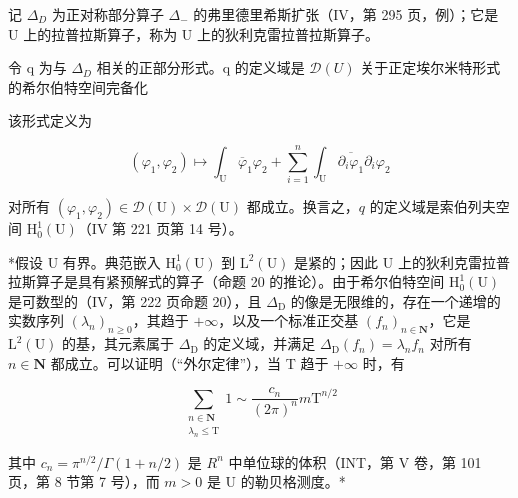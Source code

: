 记 \(\Delta_{D}\) 为正对称部分算子 \(\Delta_{-}\) 的弗里德里希斯扩张（IV，第 295 页，例）；它是 U 上的拉普拉斯算子，称为 U 上的狄利克雷拉普拉斯算子。

令 q 为与 \(\Delta_{D}\) 相关的正部分形式。q 的定义域是 \(\mathcal{D}(U)\) 关于正定埃尔米特形式的希尔伯特空间完备化

该形式定义为

\[
(\varphi_ {1}, \varphi_ {2}) \mapsto \int_ {\mathrm{U}} \overline {{\varphi}} _ {1} \varphi_ {2} + \sum_ {i = 1} ^ {n} \int_ {\mathrm{U}} \overline {{\partial_ {i} \varphi_ {1}}} \partial_ {i} \varphi_ {2}
\]

对所有 \((\varphi_{1},\varphi_{2})\in\mathcal{D}(\mathrm{U})\times\mathcal{D}(\mathrm{U})\) 都成立。换言之，\(q\) 的定义域是索伯列夫空间 \(\mathrm{H}_{0}^{1}(\mathrm{U})\)（IV 第 221 页第 14 号）。

*假设 U 有界。典范嵌入 \(\mathrm{H}_0^1 (\mathrm{U})\) 到 \(\mathrm{L}^2 (\mathrm{U})\) 是紧的；因此 U 上的狄利克雷拉普拉斯算子是具有紧预解式的算子（命题 20 的推论）。由于希尔伯特空间 \(\mathrm{H}_0^1 (\mathrm{U})\) 是可数型的（IV，第 222 页命题 20），且 \(\Delta_{\mathrm{D}}\) 的像是无限维的，存在一个递增的实数序列 \((\lambda_n)_{n\geqslant 0}\)，其趋于 \(+\infty\)，以及一个标准正交基 \((f_n)_{n\in \mathbf{N}}\)，它是 \(\mathrm{L}^2 (\mathrm{U})\) 的基，其元素属于 \(\Delta_{\mathrm{D}}\) 的定义域，并满足 \(\Delta_{\mathrm{D}}(f_n) = \lambda_n f_n\) 对所有 \(n\in \mathbf{N}\) 都成立。可以证明（“外尔定律”），当 T 趋于 \(+\infty\) 时，有

\[
\sum_{\substack{n\in \mathbf{N}\\ \lambda_{n}\leqslant \mathrm{T}}}1\sim \frac{c_{n}}{(2\pi)^{n}} m\mathrm{T}^{n / 2}
\]

其中 \(c_{n} = \pi^{n/2}/\Gamma(1 + n/2)\) 是 \(R^{n}\) 中单位球的体积（INT，第 V 卷，第 101 页，第 8 节第 7 号），而 \(m > 0\) 是 U 的勒贝格测度。*

